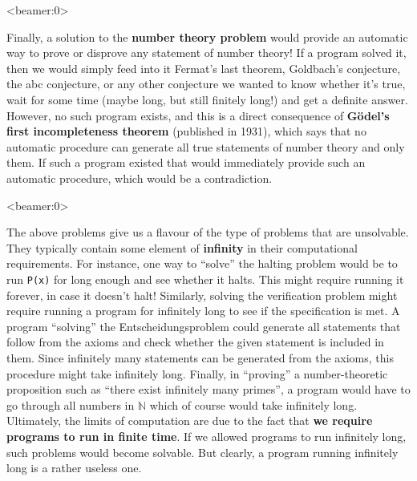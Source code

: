 \documentclass[handout, 12pt]{beamer}
\newcommand{\N}{\mathbb{N}}
\begin{document}
\begin{frame}<beamer:0>

\footnotesize
Finally, a solution to the \textbf{number theory problem} would provide an automatic way to prove or disprove any statement of number theory! If a program solved it, then we would simply feed into it Fermat's last theorem, Goldbach's conjecture, the abc conjecture, or any other conjecture we wanted to know whether it's true, wait for some time (maybe long, but still finitely long!) and get a definite answer. However, no such program exists, and this is a direct consequence of \textbf{G\"{o}del's first incompleteness theorem} (published in 1931), which says that no automatic procedure can generate all true statements of number theory and only them. If such a program existed that would immediately provide such an automatic procedure, which would be a contradiction.

\end{frame}

\begin{frame}<beamer:0>

\footnotesize
The above problems give us a flavour of the type of problems that are unsolvable. They typically contain some element of \textbf{infinity} in their computational requirements. For instance, one way to ``solve'' the halting problem would be to run \texttt{P(x)} for long enough and see whether it halts. This might require running it forever, in case it doesn't halt! Similarly, solving the verification problem might require running a program for infinitely long to see if the specification is met. A program ``solving'' the Entscheidungsproblem could generate all statements that follow from the axioms and check whether the given statement is included in them. Since infinitely many statements can be generated from the axioms, this procedure might take infinitely long. Finally, in ``proving'' a number-theoretic proposition such as ``there exist infinitely many primes'', a program would have to go through all numbers in $\N$ which of course would take infinitely long.
\\[0.6em]
Ultimately, the limits of computation are due to the fact that \textbf{we require programs to run in finite time}. If we allowed programs to run infinitely long, such problems would become solvable. But clearly, a program running infinitely long is a rather useless one.

\end{frame}
\end{document}
